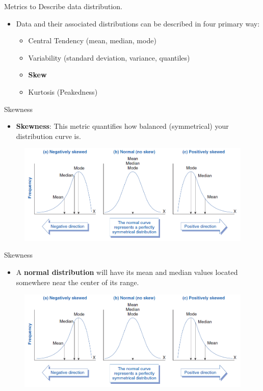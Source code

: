 \documentclass[
  ignorenonframetext,
]{beamer}
\providecommand{\tightlist}{%
  \setlength{\itemsep}{0pt}\setlength{\parskip}{0pt}}
\begin{document}
\begin{frame}{Metrics to Describe data distribution.}
\label{metrics-to-describe-data-distribution.-3}
\begin{itemize}
\item
  Data and their associated distributions can be described in four
  primary way:

  \begin{itemize}
  \tightlist
  \item
    Central Tendency (mean, median, mode)
  \item
    Variability (standard deviation, variance, quantiles)
  \item
    \textbf{Skew}
  \item
    Kurtosis (Peakedness)
  \end{itemize}
\end{itemize}
\end{frame}

\begin{frame}{Skewness}
\label{skewness}
\begin{itemize}
\tightlist
\item
  \textbf{Skewness}: This metric quantifies how balanced (symmetrical)
  your distribution curve is.
\end{itemize}

\begin{figure}
\includegraphics[width=0.8\linewidth]{fig/skewness} \end{figure}
\end{frame}

\begin{frame}{Skewness}
\label{skewness-1}
\begin{itemize}
\tightlist
\item
  A \textbf{normal distribution} will have its mean and median values
  located somewhere near the center of its range.
\end{itemize}

\begin{figure}
\includegraphics[width=0.8\linewidth]{fig/skewness} \end{figure}
\end{frame}
\end{document}
